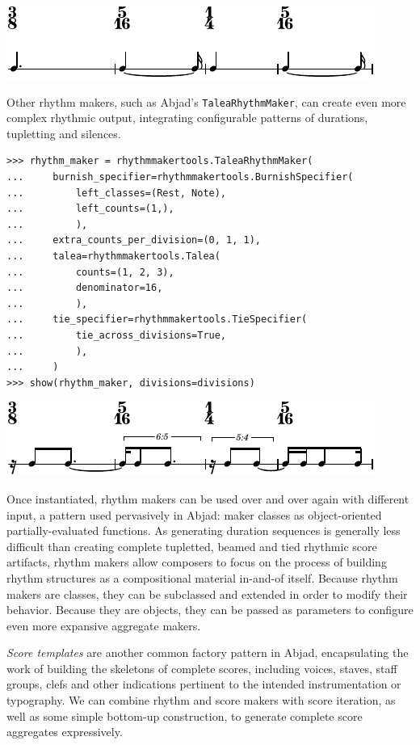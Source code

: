 \documentclass{article}
\begin{document}
\noindent\includegraphics[scale=1.0]{images/abjad-4.pdf}


Other rhythm makers, such as Abjad's \texttt{TaleaRhythmMaker}, can create even
more complex rhythmic output, integrating configurable patterns of durations,
tupletting and silences.

\begin{lstlisting}
>>> rhythm_maker = rhythmmakertools.TaleaRhythmMaker(
...     burnish_specifier=rhythmmakertools.BurnishSpecifier(
...         left_classes=(Rest, Note),
...         left_counts=(1,),
...         ),
...     extra_counts_per_division=(0, 1, 1),
...     talea=rhythmmakertools.Talea(
...         counts=(1, 2, 3),
...         denominator=16,
...         ),
...     tie_specifier=rhythmmakertools.TieSpecifier(
...         tie_across_divisions=True,
...         ),
...     )
>>> show(rhythm_maker, divisions=divisions)
\end{lstlisting}

\noindent\includegraphics[scale=1.0]{images/abjad-5.pdf}


Once instantiated, rhythm makers can be used over and over again with different
input, a pattern used pervasively in Abjad: maker classes as object-oriented
partially-evaluated functions. As generating duration sequences is generally
less difficult than creating complete tupletted, beamed and tied rhythmic score
artifacts, rhythm makers allow composers to focus on the process of building
rhythm structures as a compositional material in-and-of itself. Because rhythm
makers are classes, they can be subclassed and extended in order to modify
their behavior. Because they are objects, they can be passed as parameters to
configure even more expansive aggregate makers.

\emph{Score templates} are another common factory pattern in Abjad,
encapsulating the work of building the skeletons of complete scores, including
voices, staves, staff groups, clefs and other indications pertinent to the
intended instrumentation or typography. We can combine rhythm and score makers
with score iteration, as well as some simple bottom-up construction, to
generate complete score aggregates expressively.
\end{document}
